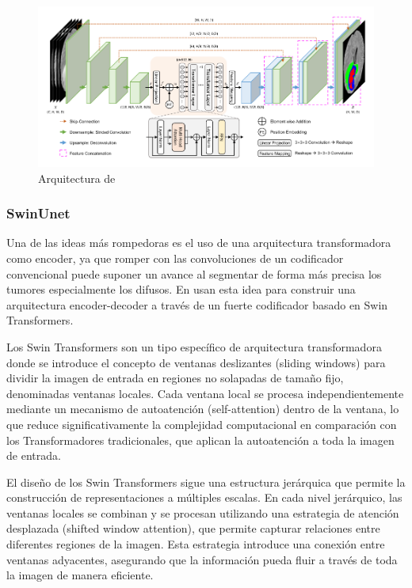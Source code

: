 	\begin{figure}[H]
		\centering
		\includegraphics[width=1.0\linewidth]{imagenes/transbts.png}
		\caption{Arquitectura de \cite{wenxuan2021transbts}}
	\end{figure}
	
	\subsubsection{SwinUnet}
	
	Una de las ideas más rompedoras es el uso de una arquitectura transformadora como encoder, ya que romper con las convoluciones de un codificador convencional puede suponer un avance al segmentar de forma más precisa los tumores especialmente los difusos. En \cite{hatamizadeh2021swin} usan esta idea para construir una arquitectura encoder-decoder a través de un fuerte codificador basado en Swin Transformers.
	
	Los Swin Transformers \cite{liu2021swin} son un tipo específico de arquitectura transformadora donde se introduce el concepto de ventanas deslizantes (sliding windows) para dividir la imagen de entrada en regiones no solapadas de tamaño fijo, denominadas ventanas locales. Cada ventana local se procesa independientemente mediante un mecanismo de autoatención (self-attention) dentro de la ventana, lo que reduce significativamente la complejidad computacional en comparación con los Transformadores tradicionales, que aplican la autoatención a toda la imagen de entrada.
	
	El diseño de los Swin Transformers sigue una estructura jerárquica que permite la construcción de representaciones a múltiples escalas. En cada nivel jerárquico, las ventanas locales se combinan y se procesan utilizando una estrategia de atención desplazada (shifted window attention), que permite capturar relaciones entre diferentes regiones de la imagen. Esta estrategia introduce una conexión entre ventanas adyacentes, asegurando que la información pueda fluir a través de toda la imagen de manera eficiente.
	
